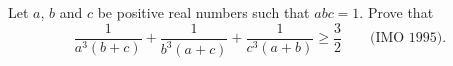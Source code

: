 Let $a$, $b$ and $c$ be positive real numbers such that $abc = 1$. Prove that
\[ \frac{1}{a^3(b + c)} + \frac{1}{b^3(a + c)} + \frac{1}{c^3(a + b)} \geq \frac{3}{2} \qquad \text{(IMO 1995).} \]
